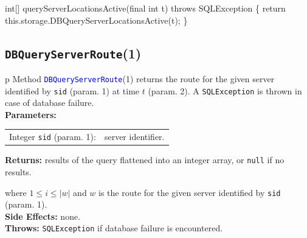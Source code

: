 \nwenddocs{}\endmoddef{}
int[] queryServerLocationsActive(final int t) throws SQLException \{
  return this.storage.DBQueryServerLocationsActive(t);
\}
\eatline
{}\nwendcode{}\nwdocspar
\subsection{\texttt{DBQueryServerRoute}(1)}
\begin{tabular}{p{\textwidth}}
\toprule
{}
Method \textcolor{blue}{{\tt{}\protect{}DBQueryServerRoute}}(1) returns the route for the
given server identified by {\tt{}sid} (param. 1) at time $t$ (param. 2).
A {\tt{}SQLException} is thrown in case of database failure.\\
\midrule
\textbf{Parameters:} \\
\begin{tabular}{lp{116mm}}
Integer {\tt{}sid} (param. 1):&server identifier.\\
\end{tabular}
\textbf{Returns:} results of the query flattened into an integer array,
or {\tt{}null} if no results.


where $1\leq i\leq |w|$ and $w$ is the route for the given server
identified by {\tt{}sid} (param. 1).\\
\textbf{Side Effects:} none.\\
\textbf{Throws:} {\tt{}SQLException} if database failure is encountered.\\
\bottomrule
\end{tabular}
